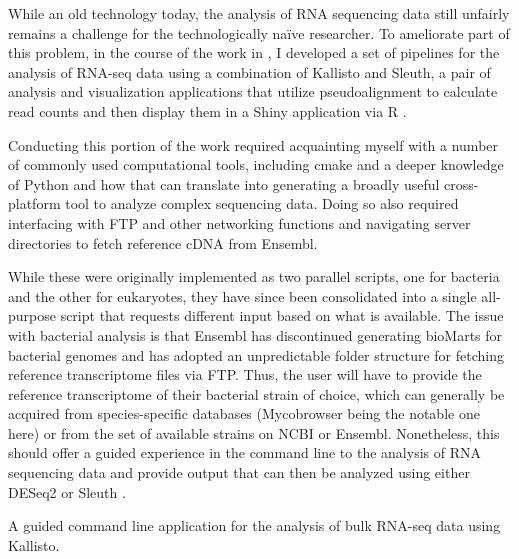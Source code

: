 While an old technology today, the analysis of RNA sequencing data still unfairly remains a challenge for the technologically na\"{i}ve researcher. To ameliorate part of this problem, in the course of the work in \citet{Saelens2022}, I developed a set of pipelines for the analysis of RNA\hyp{}seq data using a combination of Kallisto and Sleuth, a pair of analysis and visualization applications that utilize pseudoalignment to calculate read counts and then display them in a Shiny application via R \citep{Bray2016, Pimentel2017}.

Conducting this portion of the work required acquainting myself with a number of commonly used computational tools, including cmake and a deeper knowledge of Python and how that can translate into generating a broadly useful cross\hyp{}platform tool to analyze complex sequencing data. Doing so also required interfacing with FTP and other networking functions and navigating server directories to fetch reference cDNA from Ensembl.

While these were originally implemented as two parallel scripts, one for bacteria and the other for eukaryotes, they have since been consolidated into a single all\hyp{}purpose script that requests different input based on what is available. The issue with bacterial analysis is that Ensembl has discontinued generating bioMarts for bacterial genomes and has adopted an unpredictable folder structure for fetching reference transcriptome files via FTP. Thus, the user will have to provide the reference transcriptome of their bacterial strain of choice, which can generally be acquired from species\hyp{}specific databases (Mycobrowser being the notable one here) or from the set of available strains on NCBI or Ensembl. Nonetheless, this should offer a guided experience in the command line to the analysis of RNA sequencing data and provide output that can then be analyzed using either DESeq2 or Sleuth \citep{Love2014, Pimentel2017}.

\begin{code}
\caption{A guided command line application for the analysis of bulk RNA\hyp{}seq data using Kallisto.}
\label{kallisto}

\inputminted[breaklines,frame=single,fontsize=\small]{python}{source/allKallisto.py}

\end{code}

